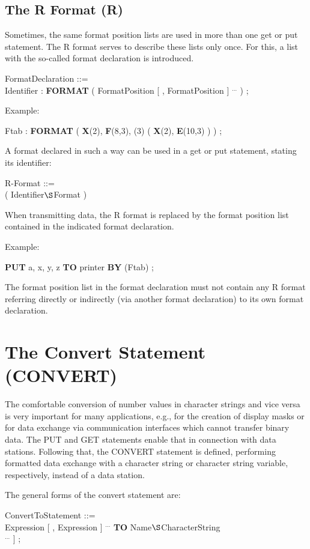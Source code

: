 \subsection{The R Format (R)}   %
\label{sec_dation_r_format}

Sometimes, the same format position lists are used in more than one get
or put statement. The R format serves to describe these lists only
once. For this, a list with the so-called format declaration is
introduced.

FormatDeclaration ::=\\
\x Identifier : {\bf FORMAT} ( FormatPosition [ , FormatPosition ] $^{...}$ ) ;

Example:

Ftab : {\bf FORMAT} ( {\bf X}(2), {\bf F}(8,3), (3) ( {\bf X}(2), {\bf E}(10,3) ) ) ;

A format declared in such a way can be used in a get or put statement,
stating its identifier:

R-Format ::=\\
 ( Identifier$\S $Format )

When transmitting data, the R format is replaced by the format position
list contained in the indicated format declaration.

Example:

{\bf PUT} a, x, y, z {\bf TO} printer {\bf BY }(Ftab) ;

The format position list in the format declaration must not contain any
R format referring directly or indirectly (via another format
declaration) to its own format declaration.

\section{The Convert Statement (CONVERT)}   %
\label{sec_convert}

The comfortable conversion of number values in character strings and
vice versa is very important for many applications, e.g., for the
creation of display masks or for data exchange via communication
interfaces which cannot transfer binary data. The PUT and GET
statements enable that in connection with data stations. Following
that, the CONVERT statement is defined, performing formatted data
exchange with a character string or character string variable,
respectively, instead of a data station.

The general forms of the convert statement are:

ConvertToStatement ::=\\
 Expression [ , Expression ] $^{...}$ {\bf TO} Name$\S $CharacterString\\
\x [ {\bf BY} FormatPositionConvert [ FormatPositionConvert ] $^{...}$ ] ;

